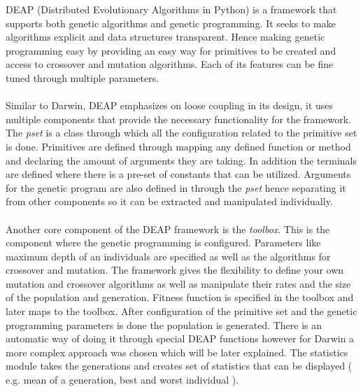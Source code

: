 DEAP (Distributed Evolutionary Algorithms in Python) is a framework that supports both genetic algorithms and genetic programming.
It seeks to make algorithms explicit and data structures transparent. Hence making genetic programming easy by providing an easy way for primitives
to be created and access to crossover and mutation algorithms. Each of its features can be fine tuned through multiple parameters.
\paragraph{}
Similar to Darwin, DEAP emphasizes on loose coupling in its design, it uses multiple components that provide the necessary functionality
for the framework. The \textit{pset} is a class through which all the configuration related to the primitive set is done. Primitives are defined
through mapping any defined function or method and declaring the amount of arguments they are taking. In addition the terminals are defined where
there is a pre-set of constants that can be utilized. Arguments for the genetic program are also defined in through the \textit{pset} hence 
separating it from other components so it can be extracted and manipulated individually.
\paragraph{}
Another core component of the DEAP framework is the \textit{toolbox}. This is the component where the genetic programming is configured. Parameters
like maximum depth of an individuals are specified as well as the algorithms for crossover and mutation. The framework gives the flexibility to define your
own mutation and crossover algorithms as well as manipulate their rates and the size of the population and generation. Fitness function is specified in the toolbox 
and later maps to the toolbox. After configuration of the primitive set and the genetic
programming parameters is done the population is generated. There is an automatic way of doing it through special DEAP functions however for Darwin
a more complex approach was chosen which will be later explained. The statistics module takes the generations and creates
set of statistics that can be displayed ( e.g. mean of a generation, best and worst individual ).

